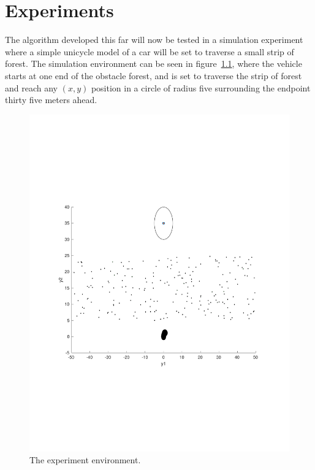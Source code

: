 \chapter{Experiments}
\label{chp:experiments}

The \rrtfunnel{} algorithm developed this far will now be tested in a simulation
experiment where a simple unicycle model of a car will be set to traverse a
small strip of forest. The simulation environment can be seen in
figure~\cref{fig:simulated-forest}, where the vehicle starts at one end of the
obstacle forest, and is set to traverse the strip of forest and reach any
\((x,y)\) position in a circle of radius five surrounding the endpoint thirty
five meters ahead.

\begin{figure}
  \centering \includegraphics[scale=.5]{figures/experiments/simulated-forest}
  \caption{The experiment environment.}
  \label{fig:simulated-forest}
\end{figure}

